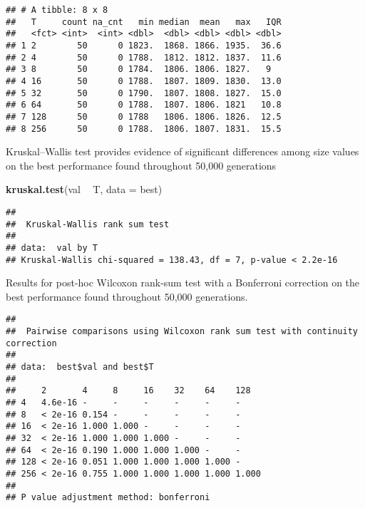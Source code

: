 \documentclass[]{book}
\newenvironment{Shaded}{\begin{snugshade}}{\end{snugshade}}
\newcommand{\DataTypeTok}[1]{\textcolor[rgb]{0.13,0.29,0.53}{#1}}
\newcommand{\KeywordTok}[1]{\textcolor[rgb]{0.13,0.29,0.53}{\textbf{#1}}}
\newcommand{\NormalTok}[1]{#1}
\newcommand{\OperatorTok}[1]{\textcolor[rgb]{0.81,0.36,0.00}{\textbf{#1}}}
\newcommand{\OtherTok}[1]{\textcolor[rgb]{0.56,0.35,0.01}{#1}}
\newcommand{\StringTok}[1]{\textcolor[rgb]{0.31,0.60,0.02}{#1}}
\begin{document}
\begin{verbatim}
## # A tibble: 8 x 8
##   T     count na_cnt   min median  mean   max   IQR
##   <fct> <int>  <int> <dbl>  <dbl> <dbl> <dbl> <dbl>
## 1 2        50      0 1823.  1868. 1866. 1935.  36.6
## 2 4        50      0 1788.  1812. 1812. 1837.  11.6
## 3 8        50      0 1784.  1806. 1806. 1827.   9  
## 4 16       50      0 1788.  1807. 1809. 1830.  13.0
## 5 32       50      0 1790.  1807. 1808. 1827.  15.0
## 6 64       50      0 1788.  1807. 1806. 1821   10.8
## 7 128      50      0 1788   1806. 1806. 1826.  12.5
## 8 256      50      0 1788.  1806. 1807. 1831.  15.5
\end{verbatim}

Kruskal--Wallis test provides evidence of significant differences among size values on the best performance found throughout 50,000 generations

\begin{Shaded}
\begin{Highlighting}[]
\KeywordTok{kruskal.test}\NormalTok{(val }\OperatorTok{~}\StringTok{ }\NormalTok{T, }\DataTypeTok{data =}\NormalTok{ best)}
\end{Highlighting}
\end{Shaded}

\begin{verbatim}
## 
##  Kruskal-Wallis rank sum test
## 
## data:  val by T
## Kruskal-Wallis chi-squared = 138.43, df = 7, p-value < 2.2e-16
\end{verbatim}

Results for post-hoc Wilcoxon rank-sum test with a Bonferroni correction on the best performance found throughout 50,000 generations.

\begin{Shaded}
\end{Shaded}

\begin{verbatim}
## 
##  Pairwise comparisons using Wilcoxon rank sum test with continuity correction 
## 
## data:  best$val and best$T 
## 
##     2       4     8     16    32    64    128  
## 4   4.6e-16 -     -     -     -     -     -    
## 8   < 2e-16 0.154 -     -     -     -     -    
## 16  < 2e-16 1.000 1.000 -     -     -     -    
## 32  < 2e-16 1.000 1.000 1.000 -     -     -    
## 64  < 2e-16 0.190 1.000 1.000 1.000 -     -    
## 128 < 2e-16 0.051 1.000 1.000 1.000 1.000 -    
## 256 < 2e-16 0.755 1.000 1.000 1.000 1.000 1.000
## 
## P value adjustment method: bonferroni
\end{verbatim}
\end{document}

